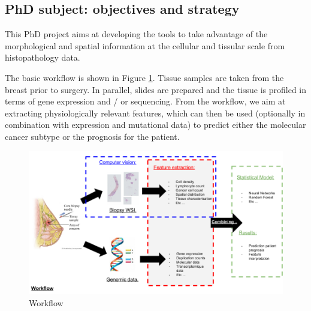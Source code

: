 \documentclass[a4paper,10pt]{article}
\begin{document}
\subsection{PhD subject: objectives and strategy}

This  PhD  project aims at developing the tools to take advantage of
the morphological and spatial information at the cellular and tissular
scale from histopathology data. 


The basic workflow is shown in Figure \ref{workflow1}. Tissue samples
are taken from the breast prior to surgery. In parallel, slides are
prepared and the tissue is profiled in terms of gene expression and /
or sequencing. From the workflow, we aim at extracting physiologically
relevant features, which can then be used (optionally in combination with
expression and mutational data) to predict either the molecular
cancer subtype or the prognosis for the patient. 

\begin{figure}[!ht]
\centering
\includegraphics[width=\textwidth]{Workflow_overview.png}
\caption{Workflow}
\label{workflow1}
\end{figure}
\end{document}
